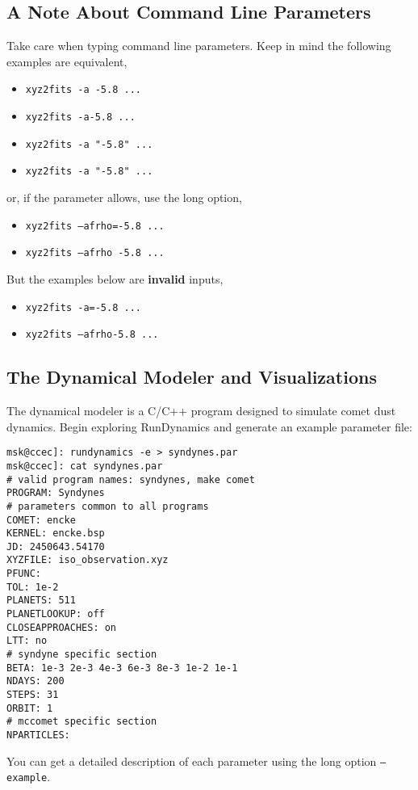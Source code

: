 \documentclass[12pt,letterpaper]{article}
\newcommand\rundynamics{RunDynamics}
\begin{document}
\subsection{A Note About Command Line Parameters}

Take care when typing command line parameters.  Keep in mind the
following examples are equivalent,
\begin{itemize}
\item \texttt{xyz2fits -a -5.8 ...}
\item \texttt{xyz2fits -a-5.8 ...}
\item \texttt{xyz2fits -a "-5.8" ...}
\item \texttt{xyz2fits -a "-5.8" ...}
\end{itemize}
or, if the parameter allows, use the long option,
\begin{itemize}
\item \texttt{xyz2fits --afrho=-5.8 ...}
\item \texttt{xyz2fits --afrho -5.8 ...}
\end{itemize}
But the examples below are \textbf{invalid} inputs,
\begin{itemize}
\item \texttt{xyz2fits -a=-5.8 ...}
\item \texttt{xyz2fits --afrho-5.8 ...}
\end{itemize}

\subsection{The Dynamical Modeler and Visualizations}
The dynamical modeler is a C/C++ program designed to simulate comet
dust dynamics.  Begin exploring \rundynamics{} and generate an example
parameter file:
\begin{lstlisting}
msk@ccec]: rundynamics -e > syndynes.par
msk@ccec]: cat syndynes.par
# valid program names: syndynes, make comet
PROGRAM: Syndynes
# parameters common to all programs
COMET: encke
KERNEL: encke.bsp
JD: 2450643.54170
XYZFILE: iso_observation.xyz
PFUNC: 
TOL: 1e-2
PLANETS: 511
PLANETLOOKUP: off
CLOSEAPPROACHES: on
LTT: no
# syndyne specific section
BETA: 1e-3 2e-3 4e-3 6e-3 8e-3 1e-2 1e-1
NDAYS: 200
STEPS: 31
ORBIT: 1
# mccomet specific section
NPARTICLES: 
\end{lstlisting}
You can get a detailed description of each parameter using the long
option \texttt{--example}.
\end{document}
